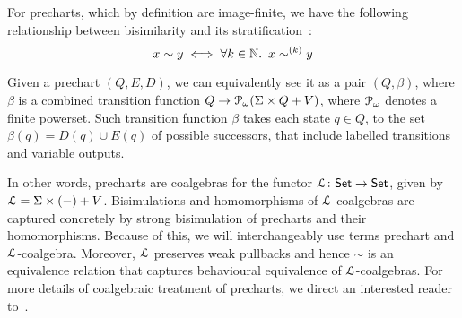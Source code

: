 For precharts, which by definition are image-finite, we have the following relationship between bisimilarity and its stratification~\cite{hennessy:1985:algebraic}:
\begin{equation}\label{eqn:stratification}
	x \sim y \iff \forall k \in \mathbb{N} \ldotp~x\sim^{(k)} y
\end{equation}

Given a prechart $(Q, E, D)$, we can equivalently see it as a pair $(Q, \beta)$, where $\beta$ is a combined transition function $Q \to \mathcal{P}_\omega (\Sigma \times Q + V)$, where $\mathcal{P}_\omega$ denotes a finite powerset. Such transition function $\beta$ takes each state $q \in Q$, to the set $\beta(q) = D(q) \cup E(q)$ of possible successors, that include labelled transitions and variable outputs.

In other words, precharts are coalgebras for the functor $\mathcal{L} \colon {\mathsf{Set}} \to {\mathsf{Set}}$, given by $\mathcal{L} = \Sigma \times (-) + V$. Bisimulations and homomorphisms of $\mathcal{L}$-coalgebras are captured concretely by strong bisimulation of precharts and their homomorphisms. Because of this, we will interchangeably use terms prechart and $\mathcal{L}$-coalgebra. Moreover, $\mathcal{L}$ preserves weak pullbacks and hence $\sim$ is an equivalence relation that captures behavioural equivalence of $\mathcal{L}$-coalgebras. For more details of coalgebraic treatment of precharts, we direct an interested reader to~\cite{Schmid:2021:Star}.
